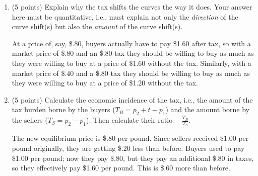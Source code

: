 \documentclass{article}
\begin{document}
\begin{enumerate}
\begin{enumerate}
    \item \begin{EXAM} (5 points) Explain why the tax shifts the curves the way it does. Your answer here must be quantitative, i.e., must explain not only the \emph{direction} of the curve shift(s) but also the \emph{amount} of the curve shift(s). \vspace{1.5in} \end{EXAM}

\begin{KEY} At a price of, say, \$.80, buyers actually have to pay \$1.60 after tax, so with a market price of \$.80 and an \$.80 tax they should be willing to buy as much as they were willing to buy at a price of \$1.60 without the tax. Similarly, with a market price of \$.40 and a \$.80 tax they should be willing to buy as much as they were willing to buy at a price of \$1.20 without the tax. %
\end{KEY}


    \item \begin{EXAM} (5 points) Calculate the economic incidence of the tax, i.e., the amount of the tax burden borne by the buyers ($T_B=p_2+t-p_1$) and the amount borne by the sellers ($T_S=p_2-p_1$). Then calculate their ratio \ \ $\displaystyle \frac{T_B}{T_S}$. \vspace{1.6in} \end{EXAM}

\begin{KEY} The new equilibrium price is \$.80 per pound. Since sellers received \$1.00 per pound originally, they are getting \$.20 less than before. Buyers used to pay \$1.00 per pound; now they pay \$.80, but they pay an additional \$.80 in taxes, so they effectively pay \$1.60 per pound. This is \$.60 more than before.



\end{KEY}
\end{enumerate}
\end{enumerate}
\end{document}
